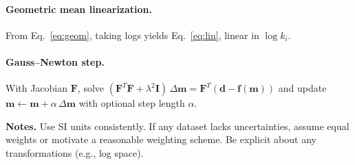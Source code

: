 \documentclass[11pt,a4paper]{article}
\begin{document}
\paragraph{Geometric mean linearization.} From Eq.~\eqref{eq:geom}, taking logs yields Eq.~\eqref{eq:lin}, linear in $\log k_i$.

\paragraph{Gauss--Newton step.} With Jacobian $\mathbf F$, solve $(\mathbf F^T\mathbf F+\lambda^2\mathbf I)\,\Delta\mathbf m=\mathbf F^T(\mathbf d-\mathbf f(\mathbf m))$ and update $\mathbf m\leftarrow \mathbf m + \alpha\,\Delta\mathbf m$ with optional step length $\alpha$.

\vspace{1ex}
\noindent\textbf{Notes.} Use SI units consistently. If any dataset lacks uncertainties, assume equal weights or motivate a reasonable weighting scheme. Be explicit about any transformations (e.g., log space).
\end{document}
